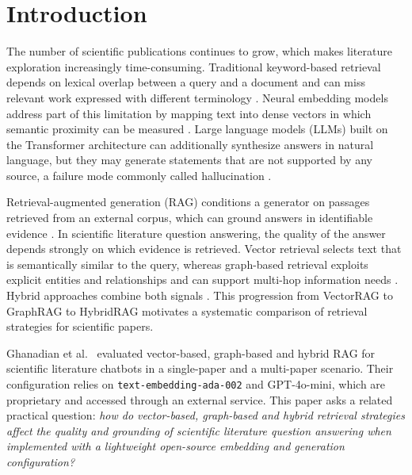 \documentclass[conference]{IEEEtran}
\begin{document}
\section{Introduction}
The number of scientific publications continues to grow, which makes literature exploration increasingly time-consuming. Traditional keyword-based retrieval depends on lexical overlap between a query and a document and can miss relevant work expressed with different terminology \cite{robertson2009bm25}. Neural embedding models address part of this limitation by mapping text into dense vectors in which semantic proximity can be measured \cite{reimers2019sbert,karpukhin2020dpr}. Large language models (LLMs) built on the Transformer architecture \cite{vaswani2017attention} can additionally synthesize answers in natural language, but they may generate statements that are not supported by any source, a failure mode commonly called hallucination \cite{ji2023hallucination}.

Retrieval-augmented generation (RAG) conditions a generator on passages retrieved from an external corpus, which can ground answers in identifiable evidence \cite{lewis2020rag,gao2023ragsurvey}. In scientific literature question answering, the quality of the answer depends strongly on which evidence is retrieved. Vector retrieval selects text that is semantically similar to the query, whereas graph-based retrieval exploits explicit entities and relationships and can support multi-hop information needs \cite{edge2024graphrag,peng2024graphragsurvey}. Hybrid approaches combine both signals \cite{sarmah2024hybridrag}. This progression from VectorRAG to GraphRAG to HybridRAG motivates a systematic comparison of retrieval strategies for scientific papers.

Ghanadian et al.\ \cite{ghanadian2026base} evaluated vector-based, graph-based and hybrid RAG for scientific literature chatbots in a single-paper and a multi-paper scenario. Their configuration relies on \texttt{text-embedding-ada-002} and GPT-4o-mini, which are proprietary and accessed through an external service. This paper asks a related practical question: \emph{how do vector-based, graph-based and hybrid retrieval strategies affect the quality and grounding of scientific literature question answering when implemented with a lightweight open-source embedding and generation configuration?}
\end{document}
